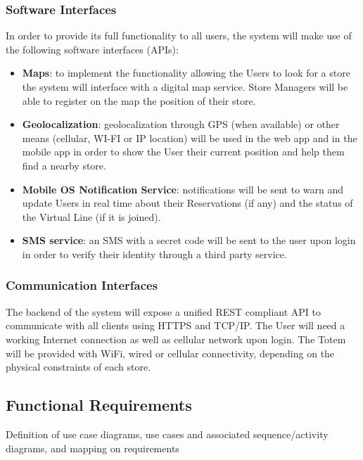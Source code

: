 \subsubsection{Software Interfaces}
In order to provide its full functionality to all users, the system will make use of the following software interfaces (APIs):
\begin{itemize}
    \item \textbf{Maps}: to implement the functionality allowing the Users to look for a store the system will interface with a digital map service. Store Managers will be able to register on the map the position of their store.
    \item \textbf{Geolocalization}: geolocalization through GPS (when available) or other means (cellular, WI-FI or IP location) will be used in the web app and in the mobile app in order to show the User their current position and help them find a nearby store.
    \item \textbf{Mobile OS Notification Service}: notifications will be sent to warn and update Users in real time about their Reservations (if any) and the status of the Virtual Line (if it is joined).
    \item \textbf{SMS service}: an SMS with a secret code will be sent to the user upon login in order to verify their identity through a third party service.
\end{itemize}

\subsubsection{Communication Interfaces}
The backend of the system will expose a unified REST compliant API to communicate with all clients using HTTPS and TCP/IP.
The User will need a working Internet connection as well as cellular network upon login.
The Totem will be provided with WiFi, wired or cellular connectivity, depending on the physical constraints of each store.

\subsection{Functional Requirements}
Definition of use case diagrams, use cases and associated
sequence/activity diagrams, and mapping on requirements

